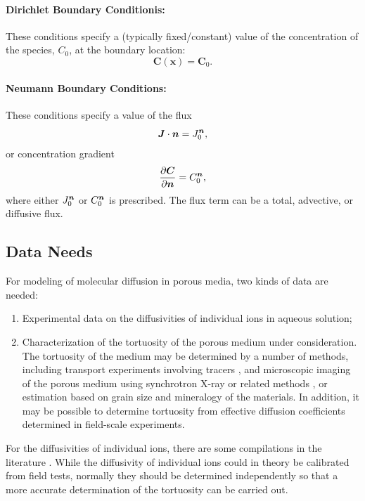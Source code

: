 \paragraph{Dirichlet Boundary Conditionis:}  
These conditions specify a (typically fixed/constant) value of the concentration of the species, $C_0$, 
at the boundary location:
\begin{equation}\label{eq:transport Dirichlet DP}
  \boldsymbol{C}(\boldsymbol{x})=\boldsymbol{C}_{0} .
\end{equation}

\paragraph{Neumann Boundary Conditions:}  
These conditions specify a value of the flux
\begin{equation}\label{eq:transport Neuman flux DP} 
  \boldsymbol{J}\cdot \boldsymbol{n} = J_0^{\boldsymbol{n}},
\end{equation}
or concentration gradient
\begin{equation}\label{eq:transport Neuman gradient DP}
  \frac{\partial \boldsymbol{C}}{\partial \boldsymbol{n}} = C_0^{\boldsymbol{n}},
\end{equation}
where either $J_0^{\boldsymbol{n}}$ or $C_0^{\boldsymbol{n}}$ is prescribed. 
The flux term can be a total, advective, or diffusive flux.




\subsection{Data Needs}

\noindent For modeling of molecular diffusion in porous media, two kinds of data are needed:
%
\begin{enumerate}
\item  
  Experimental data on the diffusivities of individual ions in aqueous solution;
\item  
  Characterization of the tortuosity of the porous medium under consideration.  
  The tortuosity of the medium may be determined by a number of methods, 
  including transport experiments involving tracers \citep{navarre2009evolution},
  and microscopic imaging of the porous medium using synchrotron X-ray
  or related methods \citep{navarre2009evolution}, or estimation based on grain size and mineralogy of the materials.  
  In addition, it may be possible to determine tortuosity from effective diffusion coefficients determined in field-scale experiments.
\end{enumerate}

\noindent  
For the diffusivities of individual ions, there are some compilations in the literature \citep{lasaga1998kinetic,steefel2009fluid}.  
While the diffusivity of individual ions could in theory be calibrated from field tests, 
normally they should be determined independently so that a more accurate determination of the tortuosity can be carried out.







